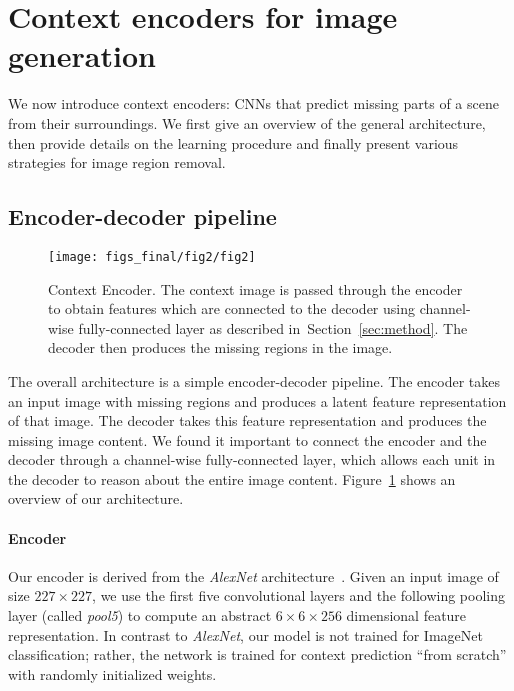 \documentclass[10pt,twocolumn,letterpaper]{article}
\newcommand{\reffig}[1]{Figure~\ref{fig:#1}}
\newcommand{\refsec}[1]{Section~\ref{sec:#1}}
\newcommand{\lblfig}[1]{\label{fig:#1}}
\newcommand{\lblsec}[1]{\label{sec:#1}}
\begin{document}
\section{Context encoders for image generation}
We now introduce context encoders: CNNs that predict missing parts of a scene from their surroundings.
We first give an overview of the general architecture, then provide details on the learning procedure and finally present various strategies for image region removal.

\subsection{Encoder-decoder pipeline}
\begin{figure}[t]
\texttt{[image: figs\_final/fig2/fig2]}
\vspace{-0.5em}
\caption{Context Encoder. The context image is passed through the encoder to obtain features which are connected to the decoder using channel-wise fully-connected layer as described in~\refsec{method}. The decoder then produces the missing regions in the image.}
\lblfig{concept}
\vspace{-0.5em}
\end{figure}
\lblsec{method}
The overall architecture is a simple encoder-decoder pipeline.
The encoder takes an input image with missing regions and produces a latent feature representation of that image.
The decoder takes this feature representation and produces the missing image content.
%
We found it important to connect the encoder and the decoder through a channel-wise fully-connected layer, which allows each unit in the decoder to reason about the entire image content.
\reffig{concept} shows an overview of our architecture.

\paragraph{Encoder}
Our encoder is derived from the \textit{AlexNet} architecture~\cite{krizhevsky2012imagenet}.
Given an input image of size $227\times 227$, we use the first five convolutional layers and the following pooling layer (called \textit{pool5}) to compute an abstract $6 \times 6 \times 256$ dimensional feature representation.
In contrast to \textit{AlexNet}, our model is not trained for ImageNet classification; rather, the network is trained for context prediction ``from scratch'' with randomly initialized weights.

%
%
%
%
\end{document}
